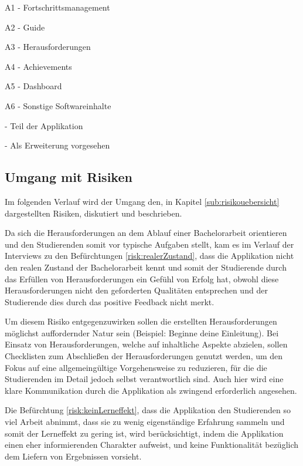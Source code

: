 \documentclass[bibliography=totoc,listof=totoc,BCOR=5mm,DIV=12,oneside]{scrbook}
\begin{document}
\begin{tablenotes}
\item  A1 - Fortschrittsmanagement
\item  A2 - Guide
\item  A3 - Herausforderungen
\item  A4 - Achievements
\item  A5 - Dashboard
\item  A6 - Sonstige Softwareinhalte
\item {} - Teil der Applikation
\item {} - Als Erweiterung vorgesehen
\end{tablenotes} 
\label{tab:abdeckungProduktfunktionen}

\newpage
\subsection{Umgang mit Risiken}
\par Im folgenden Verlauf wird der Umgang den, in Kapitel \ref{sub:risikouebersicht} dargestellten Risiken, diskutiert und beschrieben.
\par \medskip Da sich die Herausforderungen an dem Ablauf einer Bachelorarbeit orientieren und den Studierenden somit vor typische Aufgaben stellt, kam es im Verlauf der Interviews zu den Befürchtungen \ref{risk:realerZustand}, dass die Applikation nicht den realen Zustand der Bachelorarbeit kennt und somit der Studierende durch das Erfüllen von Herausforderungen ein Gefühl von Erfolg hat, obwohl diese Herausforderungen nicht den geforderten Qualitäten entsprechen und der Studierende dies durch das positive Feedback nicht merkt.
\par Um diesem Risiko entgegenzuwirken sollen die erstellten Herausforderungen möglichst auffordernder Natur sein (Beispiel: Beginne deine Einleitung). Bei Einsatz von Herausforderungen, welche auf inhaltliche Aspekte abzielen, sollen Checklisten zum Abschließen der Herausforderungen genutzt werden, um den Fokus auf eine allgemeingültige Vorgehensweise zu reduzieren, für die die Studierenden im Detail jedoch selbst verantwortlich sind. Auch hier wird eine klare Kommunikation durch die Applikation als zwingend erforderlich angesehen.

\par \medskip Die Befürchtung \ref{risk:keinLerneffekt}, dass die Applikation den Studierenden so viel Arbeit abnimmt, dass sie zu wenig eigenständige Erfahrung sammeln und somit der Lerneffekt zu gering ist, wird berücksichtigt, indem die Applikation einen eher informierenden Charakter aufweist, und keine Funktionalität bezüglich dem Liefern von Ergebnissen vorsieht.
\end{document}
